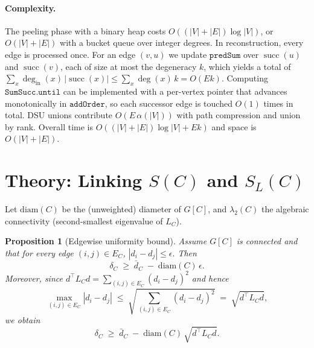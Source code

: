 \documentclass{article} %
\DeclareMathOperator{\succset}{succ}  %
\newtheorem{proposition}{Proposition}
\newtheorem{theorem}{Theorem}
\theoremstyle{remark}
\newcommand{\diam}{\mathrm{diam}}
\begin{document}
\paragraph{Complexity.}
The peeling phase with a binary heap costs $O((|V|+|E|)\log|V|)$, or $O(|V|+|E|)$ with a bucket queue over integer degrees. In reconstruction, every edge is processed once. For an edge $(v,u)$ we update $\texttt{predSum}$ over $\succset(u)$ and $\succset(v)$, each of size at most the degeneracy $k$, which yields a total of $\sum_x \deg_{\text{in}}(x)\,|\succset(x)| \le \sum_x \deg(x)\,k = O(Ek)$. Computing $\texttt{SumSucc.until}$ can be implemented with a per-vertex pointer that advances monotonically in $\texttt{addOrder}$, so each successor edge is touched $O(1)$ times in total. DSU unions contribute $O(E\,\alpha(|V|))$ with path compression and union by rank. Overall time is $O((|V|+|E|)\log|V| + Ek)$ and space is $O(|V|+|E|)$.



\section{Theory: Linking \texorpdfstring{$S(C)$}{S(C)} and \texorpdfstring{$S_L(C)$}{SL(C)}}

Let \(\diam(C)\) be the (unweighted) diameter of \(G[C]\), and \(\lambda_2(C)\) the algebraic connectivity (second-smallest eigenvalue of \(L_C\)).

\begin{proposition}[Edgewise uniformity bound]
\label{prop:diam_bound}
Assume \(G[C]\) is connected and that for every edge \((i,j)\in E_C\),
\(
|d_i-d_j|\le \epsilon.
\)
Then
\[
\delta_C \;\ge\; \bar d_C \;-\; \diam(C)\,\epsilon.
\]
Moreover, since \(d^\top L_C d = \sum_{(i,j)\in E_C}(d_i-d_j)^2\) and hence
\[
\max_{(i,j)\in E_C} |d_i-d_j|
\;\le\;
\sqrt{\sum_{(i,j)\in E_C}(d_i-d_j)^2}
\;=\;\sqrt{d^\top L_C d},
\]
we obtain
\begin{equation}
\label{eq:boundA}
\delta_C \;\ge\; \bar d_C \;-\; \diam(C)\,\sqrt{d^\top L_C d}.
\end{equation}
\end{proposition}
\end{document}
